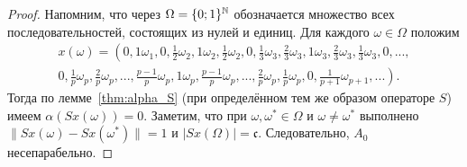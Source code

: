 \begin{proof}
	Напомним, что через $\Omega = \{0;1\}^{\mathbb{N}}$
	обозначается множество всех последовательностей, состоящих из нулей и единиц.
	Для каждого $\omega\in\Omega$ положим
	\begin{multline}
		\label{eq:x_omega_alpha_c}
		x(\omega)=\left(
			0, 1\omega_1,
			0, \frac{1}{2}\omega_2, 1\omega_2, \frac{1}{2}\omega_2,
			0, \frac{1}{3}\omega_3, \frac{2}{3}\omega_3, 1\omega_3, \frac{2}{3}\omega_3, \frac{1}{3}\omega_3,
			0, ...,
		\right. \\ \left.
			0, \frac{1}{p}\omega_p, \frac{2}{p}\omega_p, ..., \frac{p-1}{p}\omega_p, 1\omega_p,
				\frac{p-1}{p}\omega_p, ..., \frac{2}{p}\omega_p, \frac{1}{p}\omega_p,
			0, \frac{1}{p+1}\omega_{p+1}, ...
		\right).
	\end{multline}
	Тогда по лемме~\ref{thm:alpha_S} (при определённом тем же образом операторе $S$) имеем
	$\alpha(Sx(\omega)) = 0$.
	Заметим, что при $\omega,\omega^* \in \Omega$ и $\omega\neq\omega^*$ выполнено
	$\|Sx(\omega)-Sx(\omega^*)\|=1$ и $|Sx(\Omega)|=\mathfrak{c}$.
	Следовательно, $A_0$ несепарабельно.
\end{proof}


